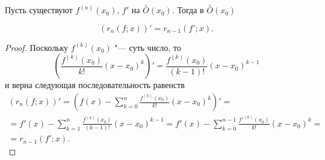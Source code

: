 \begin{lemm}\label{ch5:simplemm}
Пусть существуют $f^{(n)}(x_0)$, $f'$ на $\overset{\circ}{O}(x_0)$. Тогда в $\overset{\circ}{O}(x_0)$

$$
(r_n(f;x))'=r_{n-1}(f';x).
$$
\end{lemm}
\begin{proof}
Поскольку $f^{(k)}(x_0)$ "--- суть число, то $$\left(\frac{f^{(k)}(x_0)}{k!} (x - x_0)^k\right)' =  \frac{f^{(k)}(x_0)}{(k-1)!} (x - x_0)^{k-1}$$ и верна следующая последовательность равенств
\begin{multline*}
(r_n(f;x))' = \left(f(x) - \sum_{k = 0}^{n} \frac{f^{(k)}(x_0)}{k!} (x - x_0)^k \right)' =
\\ = f'(x) - \sum_{k = 1}^{n} \frac{f^{(k)}(x_0)}{(k-1)!} (x - x_0)^{k-1}= f'(x) - \sum_{k = 0}^{n-1} \frac{{f'} ^{(k)}(x_0)}{k!} (x - x_0)^k =\\=r_{n-1}(f';x). \tag*{\qedhere}
\end{multline*}
\end{proof}


